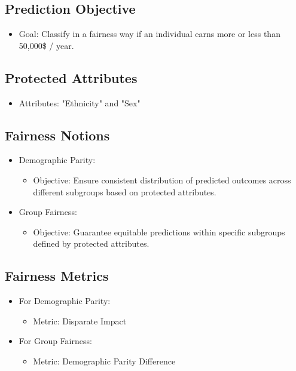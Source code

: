 \subsection{Prediction Objective}

\begin{itemize}
    \item Goal: Classify in a fairness way if an individual earns more or less than 50,000\$ / year.
\end{itemize}

\subsection{Protected Attributes}

\begin{itemize}
    \item Attributes: "Ethnicity" and "Sex"
\end{itemize}

\subsection{Fairness Notions}

\begin{itemize}
    \item Demographic Parity:
    \begin{itemize}
        \item Objective: Ensure consistent distribution of predicted outcomes across different subgroups based on protected attributes.
    \end{itemize}
    
    \item Group Fairness:
    \begin{itemize}
        \item Objective: Guarantee equitable predictions within specific subgroups defined by protected attributes.
    \end{itemize}
\end{itemize}

\subsection{Fairness Metrics}

\begin{itemize}
    \item For Demographic Parity:
    \begin{itemize}
        \item Metric: Disparate Impact
    \end{itemize}
    
    \item For Group Fairness:
    \begin{itemize}
        \item Metric: Demographic Parity Difference
    \end{itemize}
\end{itemize}

